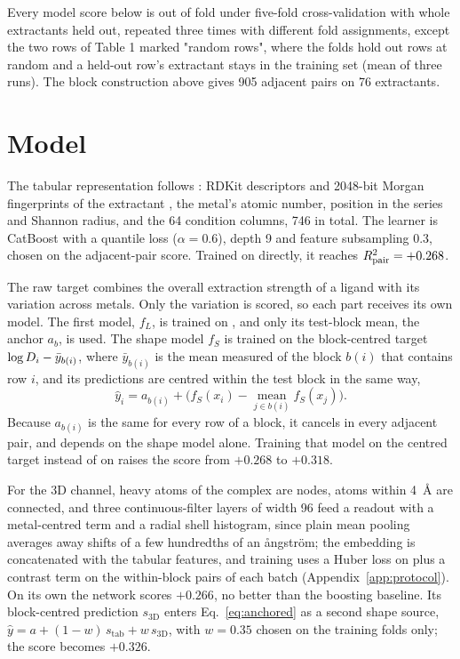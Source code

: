 Every model score below is out of fold under five-fold cross-validation with whole extractants held out, repeated three times with different fold assignments, except the two rows of Table 1 marked "random rows", where the folds hold out rows at random and a held-out row's extractant stays in the training set (mean of three runs). The block construction above gives 905 adjacent pairs on 76 extractants.

\section{Model}
\label{sec:model}
The tabular representation follows \citet{liu2022}: RDKit descriptors and 2048-bit Morgan fingerprints of the extractant \citep{rogers2010}, the metal's atomic number, position in the series and Shannon radius, and the 64 condition columns, 746 in total. The learner is CatBoost \citep{catboost2018} with a quantile loss ($\alpha = 0.6$), depth 9 and feature subsampling 0.3, chosen on the adjacent-pair score. Trained on \logD{} directly, it reaches $R^2_{\mathrm{pair}} = +0.268$.

The raw target combines the overall extraction strength of a ligand with its variation across metals. Only the variation is scored, so each part receives its own model. The first model, $f_L$, is trained on \logD{}, and only its test-block mean, the anchor $a_b$, is used. The shape model $f_S$ is trained on the block-centred target $\log D_i - \bar y_{b(i)}$, where $\bar y_{b(i)}$ is the mean measured \logD{} of the block $b(i)$ that contains row $i$, and its predictions are centred within the test block in the same way,
\begin{equation}
  \hat y_i = a_{b(i)} + \Big(f_S(x_i) - \operatorname*{mean}_{j \in b(i)} f_S(x_j)\Big).
  \label{eq:anchored}
\end{equation}
Because $a_{b(i)}$ is the same for every row of a block, it cancels in every adjacent pair, and \adjR{} depends on the shape model alone. Training that model on the centred target instead of on \logD{} raises the score from $+0.268$ to $+0.318$.

For the 3D channel, heavy atoms of the complex are nodes, atoms within 4~\AA{} are connected, and three continuous-filter layers of width 96 \citep{schnet2017} feed a readout with a metal-centred term and a radial shell histogram, since plain mean pooling averages away shifts of a few hundredths of an \aa ngstr\"om; the embedding is concatenated with the tabular features, and training uses a Huber loss on \logD{} plus a contrast term on the within-block pairs of each batch (Appendix~\ref{app:protocol}). On its own the network scores $+0.266$, no better than the boosting baseline. Its block-centred prediction $s_{\mathrm{3D}}$ enters Eq.~\eqref{eq:anchored} as a second shape source, $\hat y = a + (1-w)\,s_{\mathrm{tab}} + w\,s_{\mathrm{3D}}$, with $w = 0.35$ chosen on the training folds only; the score becomes $+0.326$.

